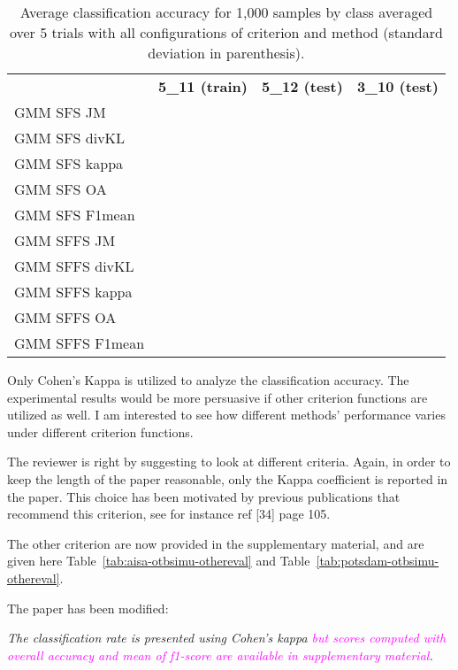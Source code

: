 \documentclass[a4paper,10pt,DIV=16]{scrartcl}
\newcommand{\rev}[1]{\textcolor{magenta}{#1}}
\begin{document}
    \begin{table}[!t]
        \centering
        \caption{Average classification accuracy for 1,000 samples by class averaged over 5 trials  with all configurations of criterion and method (standard deviation in parenthesis).\label{tab:potsdam-otbsimu-all}}
        \begin{tabular}{lccc}\toprule
            & {\bfseries 5\_11 (train)} & {\bfseries 5\_12 (test)} & {\bfseries 3\_10 (test)} \\ \cmidrule{2-4}
            GMM SFS JM &      &&\\
            GMM SFS divKL &   &&\\
            GMM SFS kappa &   &&\\
            GMM SFS OA &      &&\\
            GMM SFS F1mean &  &&\\
            GMM SFFS JM &     &&\\
            GMM SFFS divKL &  &&\\
            GMM SFFS kappa &  &&\\
            GMM SFFS OA &     &&\\
            GMM SFFS F1mean & &&\\
            \bottomrule
        \end{tabular}
    \end{table}

\begin{revbox}
  Only Cohen’s Kappa is utilized to analyze the classification accuracy. The experimental results would be more persuasive if other criterion functions are utilized as well. I am interested to see how different methods’ performance varies under different criterion functions.
  \begin{resbox}
    The reviewer is right by suggesting to look at different criteria. Again, in order to keep the length of the paper reasonable, only the Kappa coefficient is reported in the paper. This choice has been motivated by previous publications that recommend this criterion, see for instance ref [34] page 105.

    The other criterion are now provided in the supplementary material, and are given here Table~\ref{tab:aisa-otbsimu-othereval} and  Table~\ref{tab:potsdam-otbsimu-othereval}.

    The paper has been modified:

    \emph{The    classification   rate    is    presented   using    Cohen's kappa \rev{but scores computed with overall accuracy and mean of f1-score are available in supplementary material}.}
  \end{resbox}
\end{revbox}
\end{document}
